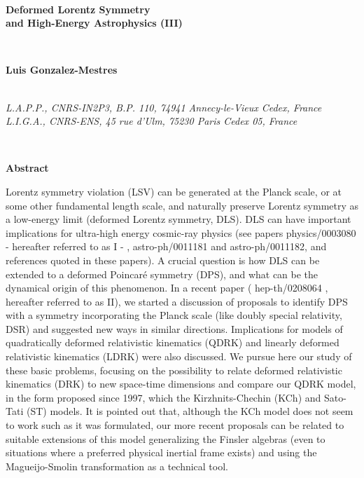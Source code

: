 \documentclass[a4paper,12pt,dvips]{article}
\begin{document}
%
\makeatletter{}
\makeatother\thispagestyle{icrc}
%
%

\begin{center}
%
~ 

{\LARGE \bf Deformed Lorentz Symmetry\\ 
and High-Energy Astrophysics (III)}
\end{center}

\begin{center}
%
%
~ 

{\bf Luis Gonzalez-Mestres\coordHE{}}\\

~ 

{\it {}\coordHE{} L.A.P.P., CNRS-IN2P3, B.P. 110, 74941 Annecy-le-Vieux Cedex, France \\
\coordHE{} L.I.G.A., CNRS-ENS, 45 rue d'Ulm, 75230 Paris Cedex 05, France }
\end{center}

~ 

\begin{center}
{\large \bf Abstract\\}
\end{center}
\vspace{-0.5ex}
%
%
Lorentz symmetry violation (LSV) 
can be generated at the Planck scale, or at some
other fundamental length scale, and
naturally preserve Lorentz symmetry
as a low-energy limit (deformed Lorentz symmetry, DLS). 
DLS can
have important implications for ultra-high energy cosmic-ray physics
(see papers physics/0003080 - hereafter referred to as I - , astro-ph/0011181 and astro-ph/0011182, and references quoted in these papers). A crucial
question is how DLS can be extended to a deformed Poincar\'e symmetry (DPS), and what can be the dynamical origin of this phenomenon. In a recent paper ( hep-th/0208064 , hereafter referred to as II), we started a discussion of proposals to identify DPS with a symmetry incorporating the Planck scale (like doubly special relativity, DSR) and suggested new ways in similar directions. Implications for models of quadratically deformed relativistic kinematics (QDRK) and linearly deformed relativistic kinematics (LDRK) were also discussed. We pursue here our study of these basic problems, focusing on the possibility to relate deformed relativistic kinematics (DRK) to new space-time dimensions and compare our QDRK model, in the form proposed since 1997, which the Kirzhnits-Chechin (KCh) and Sato-Tati (ST) models. It is pointed out that, although the KCh model does not seem to work such as it was formulated, our more recent proposals can be related to suitable extensions of this model generalizing the Finsler algebras (even to situations where a preferred physical inertial frame exists) and using the Magueijo-Smolin transformation as a technical tool.
\end{document}
